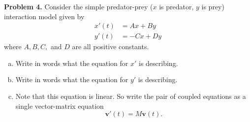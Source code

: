 \documentclass[12pt]{report} %
\theoremstyle{definition}
\begin{document}
\noindent\textbf{Problem 4.} Consider the simple predator-prey ($x$ is predator, $y$ is prey) interaction model given by
\begin{align*}
    x'(t) &= Ax+ B y\\
    y'(t) &= -C x + Dy
\end{align*}
where $A,B,C,$ and $D$ are all positive constants.
\begin{enumerate}[(a)]
    \item Write in words what the equation for $x'$ is describing.
    \item Write in words what the equation for $y'$ is describing.
    \item Note that this equation is linear.  So write the pair of coupled equations as a single vector-matrix equation
    \[
    \mathbf{v}'(t) = M\mathbf{v}(t).
    \]
\end{enumerate}
\end{document}
